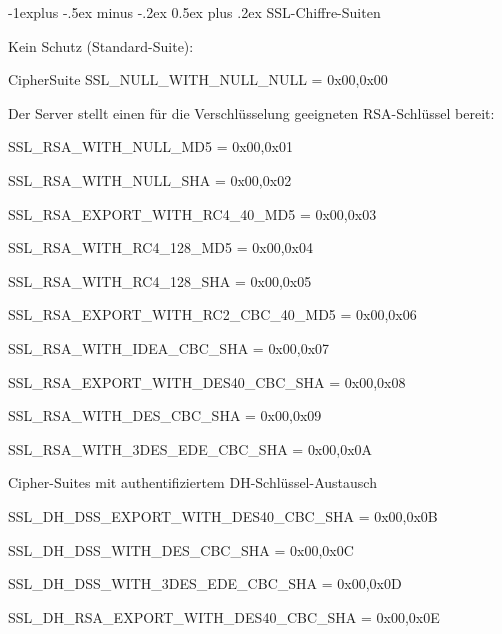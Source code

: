 \documentclass[a4paper]{article}
\makeatletter
\renewcommand{\subsection}{\@startsection{subsection}{2}{0mm}%
 {-1explus -.5ex minus -.2ex}%
 {0.5ex plus .2ex}%
 {\normalfont\normalsize\bfseries}}
\makeatother
\begin{document}
\begin{multicols}{3}
      \subsection{SSL-Chiffre-Suiten}
      \begin{itemize*}
            \item Kein Schutz (Standard-Suite):
            \begin{itemize*}
                  \item CipherSuite SSL\_NULL\_WITH\_NULL\_NULL = { 0x00,0x00 }
            \end{itemize*}
            \item Der Server stellt einen für die Verschlüsselung geeigneten RSA-Schlüssel bereit:
            \begin{itemize*}
                  \item SSL\_RSA\_WITH\_NULL\_MD5 = { 0x00,0x01 }
                  \item SSL\_RSA\_WITH\_NULL\_SHA = { 0x00,0x02 }
                  \item SSL\_RSA\_EXPORT\_WITH\_RC4\_40\_MD5 = { 0x00,0x03 }
                  \item SSL\_RSA\_WITH\_RC4\_128\_MD5 = { 0x00,0x04 }
                  \item SSL\_RSA\_WITH\_RC4\_128\_SHA = { 0x00,0x05 }
                  \item SSL\_RSA\_EXPORT\_WITH\_RC2\_CBC\_40\_MD5 = { 0x00,0x06 }
                  \item SSL\_RSA\_WITH\_IDEA\_CBC\_SHA = { 0x00,0x07 }
                  \item SSL\_RSA\_EXPORT\_WITH\_DES40\_CBC\_SHA = { 0x00,0x08 }
                  \item SSL\_RSA\_WITH\_DES\_CBC\_SHA = { 0x00,0x09 }
                  \item SSL\_RSA\_WITH\_3DES\_EDE\_CBC\_SHA = { 0x00,0x0A }
            \end{itemize*}
            \item Cipher-Suites mit authentifiziertem DH-Schlüssel-Austausch
            \begin{itemize*}
                  \item SSL\_DH\_DSS\_EXPORT\_WITH\_DES40\_CBC\_SHA = { 0x00,0x0B }
                  \item SSL\_DH\_DSS\_WITH\_DES\_CBC\_SHA = { 0x00,0x0C }
                  \item SSL\_DH\_DSS\_WITH\_3DES\_EDE\_CBC\_SHA = { 0x00,0x0D }
                  \item SSL\_DH\_RSA\_EXPORT\_WITH\_DES40\_CBC\_SHA = { 0x00,0x0E }

\end{itemize*}
\end{itemize*}
\end{multicols}
\end{document}
